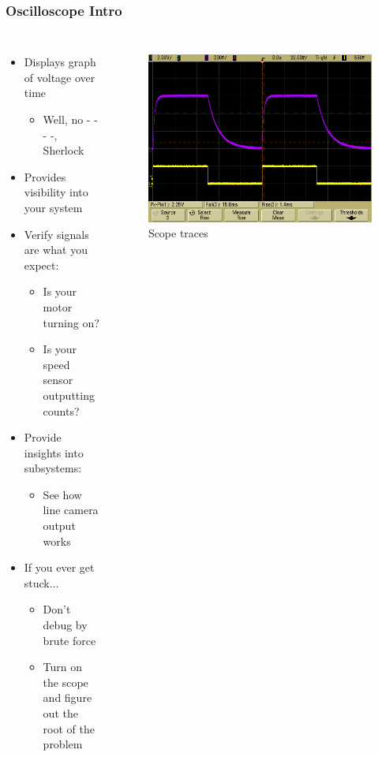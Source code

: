 \documentclass{beamer}
\begin{document}
\begin{frame}
\frametitle{Oscilloscope Intro}
\begin{columns}[t]
\begin{itemize}
  \item Displays graph of voltage over time
  \begin{itemize}
    \item Well, no - - - -, Sherlock
  \end{itemize}
  \item<2-> Provides visibility into your system
  \item<2-> Verify signals are what you expect:
  \begin{itemize}
    \item Is your motor turning on?
    \item Is your speed sensor outputting counts?
  \end{itemize}
  \item<2-> Provide insights into subsystems:
  \begin{itemize}
    \item See how line camera output works
  \end{itemize}
  \item<2-> If you ever get stuck...
  \begin{itemize}
    \item Don't debug by brute force
    \item Turn on the scope and figure out the root of the problem
  \end{itemize}
\end{itemize}

\begin{figure}
  \centering
  \includegraphics[width=1.0\columnwidth]{images-dis2/scope} \newline
  Scope traces
\end{figure}
\end{columns}
\end{frame}
\end{document}
